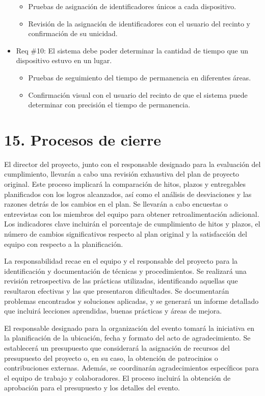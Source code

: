\documentclass[
11pt, %
]{charter}
\begin{document}
\begin{itemize}
\begin{itemize}
	\item Pruebas de asignación de identificadores únicos a cada dispositivo.
	\item Revisión de la asignación de identificadores con el usuario del recinto y confirmación de su unicidad.
\end{itemize}

\item Req \#10: El sistema debe poder determinar la cantidad de tiempo que un dispositivo estuvo en un lugar.

\begin{itemize}
	\item Pruebas de seguimiento del tiempo de permanencia en diferentes áreas.
	\item Confirmación visual con el usuario del recinto de que el sistema puede determinar con precisión el tiempo de permanencia.
\end{itemize}

\end{itemize}

\section{15. Procesos de cierre}    
\label{sec:cierre}

El director del proyecto, junto con el responsable designado para la evaluación del cumplimiento, llevarán a cabo una revisión exhaustiva del plan de proyecto original. Este proceso implicará la comparación de hitos, plazos y entregables planificados con los logros alcanzados, así como el análisis de desviaciones y las razones detrás de los cambios en el plan. Se llevarán a cabo encuestas o entrevistas con los miembros del equipo para obtener retroalimentación adicional. Los indicadores clave incluirán el porcentaje de cumplimiento de hitos y plazos, el número de cambios significativos respecto al plan original y la satisfacción del equipo con respecto a la planificación.

La responsabilidad recae en el equipo y el responsable del proyecto para la identificación y documentación de técnicas y procedimientos. Se realizará una revisión retrospectiva de las prácticas utilizadas, identificando aquellas que resultaron efectivas y las que presentaron dificultades. Se documentarán problemas encontrados y soluciones aplicadas, y se generará un informe detallado que incluirá lecciones aprendidas, buenas prácticas y áreas de mejora.

El responsable designado para la organización del evento tomará la iniciativa en la planificación de la ubicación, fecha y formato del acto de agradecimiento. Se establecerá un presupuesto que considerará la asignación de recursos del presupuesto del proyecto o, en su caso, la obtención de patrocinios o contribuciones externas. Además, se coordinarán agradecimientos específicos para el equipo de trabajo y colaboradores. El proceso incluirá la obtención de aprobación para el presupuesto y los detalles del evento.
\end{document}
